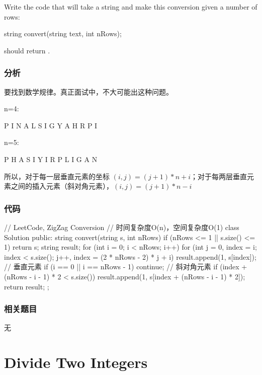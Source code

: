 Write the code that will take a string and make this conversion given a number of rows:
\begin{Code}
string convert(string text, int nRows);
\end{Code}
 should return .


\subsubsection{分析}
要找到数学规律。真正面试中，不大可能出这种问题。

n=4:
\begin{Code}
P     I     N
A   L S   I G
Y A   H R
P     I
\end{Code}

n=5:
\begin{Code}
P       H
A     S I
Y   I   R
P L     I  G
A       N
\end{Code}

所以，对于每一层垂直元素的坐标 $(i,j)= (j+1 )*n +i$；对于每两层垂直元素之间的插入元素（斜对角元素），$(i,j)= (j+1)*n -i$


\subsubsection{代码}
\begin{Code}
// LeetCode, ZigZag Conversion
// 时间复杂度O(n)，空间复杂度O(1)
class Solution {
public:
    string convert(string s, int nRows) {
        if (nRows <= 1 || s.size() <= 1) return s;
        string result;
        for (int i = 0; i < nRows; i++) {
            for (int j = 0, index = i; index < s.size();
                    j++, index = (2 * nRows - 2) * j + i) {
                result.append(1, s[index]);  // 垂直元素
                if (i == 0 || i == nRows - 1) continue;   // 斜对角元素
                if (index + (nRows - i - 1) * 2 < s.size())
                    result.append(1, s[index + (nRows - i - 1) * 2]);
            }
        }
        return result;
    }
};
\end{Code}


\subsubsection{相关题目}
\begindot
\item 无
\myenddot


\section{Divide Two Integers} %
\label{sec:divide-two-integers}


